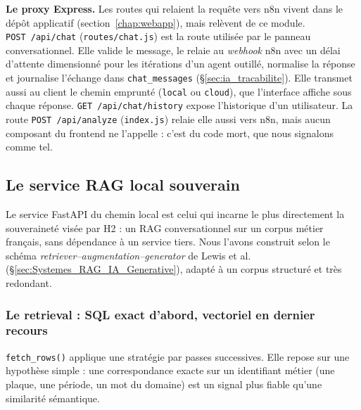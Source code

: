 \textbf{Le proxy Express.} Les routes qui relaient la requête vers n8n vivent dans le dépôt applicatif (section~\ref{chap:webapp}), mais relèvent de ce module. \texttt{POST~/api/chat} (\texttt{routes/chat.js}) est la route utilisée par le panneau conversationnel. Elle valide le message, le relaie au \textit{webhook} n8n avec un délai d'attente dimensionné pour les itérations d'un agent outillé, normalise la réponse et journalise l'échange dans \texttt{chat\_messages} (\S\ref{sec:ia_tracabilite}). Elle transmet aussi au client le chemin emprunté (\texttt{local} ou \texttt{cloud}), que l'interface affiche sous chaque réponse. \texttt{GET~/api/chat/history} expose l'historique d'un utilisateur. La route \texttt{POST~/api/analyze} (\texttt{index.js}) relaie elle aussi vers n8n, mais aucun composant du frontend ne l'appelle : c'est du code mort, que nous signalons comme tel.

\subsection{Le service RAG local souverain}
\label{sec:ia_local}

Le service FastAPI du chemin local est celui qui incarne le plus directement la souveraineté visée par H2 : un RAG conversationnel sur un corpus métier français, sans dépendance à un service tiers. Nous l'avons construit selon le schéma \textit{retriever--augmentation--generator} de Lewis et al. \cite{lewisRetrievalaugmentedGenerationKnowledgeintensive2020} (\S\ref{sec:Systemes_RAG_IA_Generative}), adapté à un corpus structuré et très redondant.

\subsubsection{Le retrieval : SQL exact d'abord, vectoriel en dernier recours}

\texttt{fetch\_rows()} applique une stratégie par passes successives. Elle repose sur une hypothèse simple : une correspondance exacte sur un identifiant métier (une plaque, une période, un mot du domaine) est un signal plus fiable qu'une similarité sémantique.

